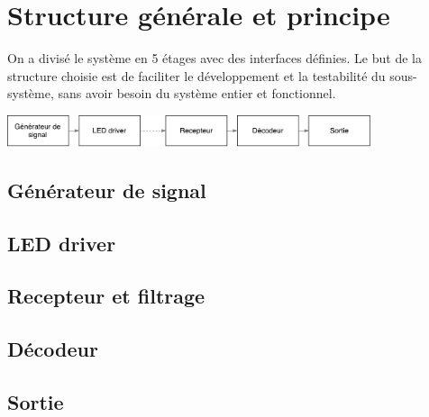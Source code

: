 \newpage
\section{Structure générale et principe}

On a divisé le système en 5 étages avec des interfaces définies.
Le but de la structure choisie est de faciliter le développement et la testabilité
du sous-système, sans avoir besoin du système entier et fonctionnel.

\includegraphics[width=0.8\textwidth]{fig/IRemote_schema_structure}

\subsection{Générateur de signal}

\subsection{LED driver}

\subsection{Recepteur et filtrage}

\subsection{Décodeur}

\subsection{Sortie}
